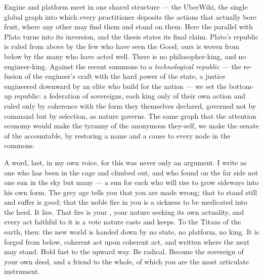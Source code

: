 Engine and platform meet in one shared structure --- the UberWiki, the single
global graph into which every practitioner deposits the actions that actually
bore fruit, where any other may find them and stand on them. Here the parallel
with Plato turns into its inversion, and the thesis states its final claim.
Plato's republic is ruled from above by the few who have seen the Good; ours is
woven from below by the many who have acted well. There is no philosopher-king,
and no engineer-king. Against the recent summons to a \emph{technological
republic} --- the re-fusion of the engineer's craft with the hard power of the
state, a justice engineered downward by an elite who build for the nation --- we
set the bottom-up republic: a federation of sovereigns, each king only of their
own action and ruled only by coherence with the form they themselves declared,
governed not by command but by selection, as nature governs. The same graph that
the attention economy would make the tyranny of the anonymous they-self, we make
the senate of the accountable, by restoring a name and a cause to every node in
the commons.

A word, last, in my own voice, for this was never only an argument. I write as
one who has been in the cage and climbed out, and who found on the far side not
one sun in the sky but many --- a sun for each who will rise to grow sideways
into his own form. The grey age tells you that you are made wrong; that to stand
still and suffer is good; that the noble fire in you is a sickness to be
medicated into the herd. It lies. That fire is your \physis, your nature seeking
its own actuality, and every act faithful to it is a vote nature casts and keeps.
To the Titans of the earth, then: the new world is handed down by no state, no
platform, no king. It is forged from below, coherent act upon coherent act, and
written where the next may stand. Hold fast to the upward way. Be radical. Become
the sovereign of your own deed, and a friend to the whole, of which you are the
most articulate instrument.

